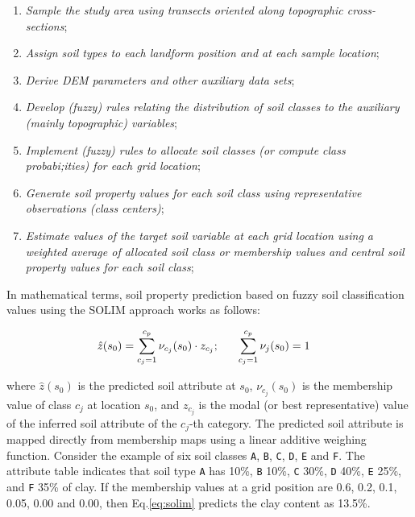 \documentclass[graybox,natbib,nospthms,UStrade]{svmono}
\begin{document}
\begin{enumerate}
\def\labelenumi{\arabic{enumi}.}
\item
  \emph{Sample the study area using transects oriented along topographic cross-sections};
\item
  \emph{Assign soil types to each landform position and at each sample location};
\item
  \emph{Derive DEM parameters and other auxiliary data sets};
\item
  \emph{Develop (fuzzy) rules relating the distribution of soil classes to the auxiliary (mainly topographic) variables};
\item
  \emph{Implement (fuzzy) rules to allocate soil classes (or compute class probabi;ities) for each grid location};
\item
  \emph{Generate soil property values for each soil class using representative observations (class centers)};
\item
  \emph{Estimate values of the target soil variable at each grid location using a weighted average of allocated soil class or membership values and central soil property values for each soil class};
\end{enumerate}

In mathematical terms, soil property prediction based on fuzzy soil
classification values using the SOLIM approach \citeauthor{Zhu2001} \citetext{\citeyear{Zhu2001}; \citealp{Zhu2010Geoderma}} works as follows:

\begin{equation}
\begin{aligned}
 \hat z({s}_0) = \sum\limits_{c_j = 1}^{c_p} {\nu _{c_j} ({s}_0) \cdot z_{c_j} }; & \hspace{.6cm}
 \sum\limits_{c_j = 1}^{c_p} {\nu _j ({s}_0)}  = 1\end{aligned}
\label{eq:solim}
\end{equation}

where \(\hat z({s}_0)\) is the predicted soil attribute at
\({s}_0\), \(\nu _{c_j} ({s}_0)\) is the membership value of class
\(c_j\) at location \({s}_0\), and \(z_{c_j}\) is the modal (or best
representative) value of the inferred soil attribute of the \(c_j\)-th
category. The predicted soil attribute is mapped directly from
membership maps using a linear additive weighing function. Consider the
example of six soil classes \texttt{A}, \texttt{B}, \texttt{C}, \texttt{D}, \texttt{E} and \texttt{F}. The
attribute table indicates that soil type \texttt{A} has 10\%, \texttt{B} 10\%, \texttt{C} 30\%,
\texttt{D} 40\%, \texttt{E} 25\%, and \texttt{F} 35\% of clay. If the membership values at a
grid position are 0.6, 0.2, 0.1, 0.05, 0.00 and 0.00, then
Eq.\eqref{eq:solim} predicts the clay content as 13.5\%.
\end{document}

